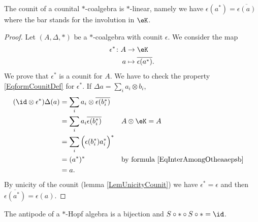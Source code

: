\begin{lemma}       \label{LemcounitstarHopfalg}
    The counit of a counital \( *\)-coalgebra is \( *\)-linear, namely we have \( \epsilon(a^*)=\overline{ \epsilon(a) }\) where the bar stands for the involution in \( \eK\).
\end{lemma}

\begin{proof}
    Let \( (A,\Delta,*)\) be a \( *\)-coalgebra with counit \( \epsilon\). We consider the map
    \begin{equation}
        \begin{aligned}
            \epsilon^*\colon A&\to \eK \\
            a&\mapsto \overline{ \epsilon(a^*) }. 
        \end{aligned}
    \end{equation}
    We prove that $\epsilon^*$ is a counit for \( A\). We have to check the property \eqref{EqformCounitDef} for \( \epsilon^*\). If \( \Delta a=\sum_ia_i\otimes b_i\),
    \begin{equation}
        \begin{aligned}[]
            (\id\otimes\epsilon^*)\Delta(a)&=\sum_ia_i\otimes\overline{ \epsilon(b_i^*) }\\
            &=\sum_ia_i\overline{ \epsilon(b_i^*) }     &&\text{$A\otimes\eK=A$}\\
            &=\sum_i\Big( \epsilon(b_i^*)a_i^* \Big)^*\\
            &=(a^*)^*       &&\text{by formula \eqref{EqInterAmongOtheaaepsb}}\\
            &=a.
        \end{aligned}
    \end{equation}
    By unicity of the counit (lemma \ref{LemUnicityCounit}) we have \( \epsilon^*=\epsilon\) and then \( \overline{ \epsilon(a^*) }=\epsilon(a)\).
\end{proof}

\begin{theorem}
    The antipode of a $*$-Hopf algebra is a bijection and \( S\circ *\circ S\circ *=\id\).
\end{theorem}

